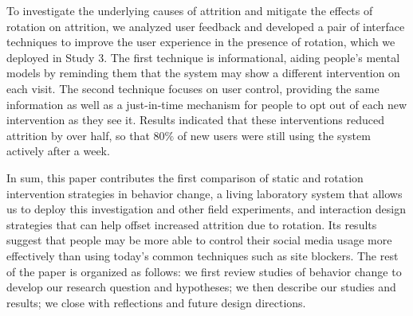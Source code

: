 To investigate the underlying causes of attrition and mitigate the effects of rotation on attrition, we analyzed user feedback and developed a pair of interface techniques to improve the user experience in the presence of rotation, which we deployed in Study 3. The first technique is informational, aiding people's mental models by reminding them that the system may show a different intervention on each visit. The second technique focuses on user control, providing the same information as well as a just-in-time mechanism for people to opt out of each new intervention as they see it. Results indicated that these interventions reduced attrition by over half, so that $80\%$ of new users were still using the system actively after a week.

In sum, this paper contributes the first comparison of static and rotation intervention strategies in behavior change, a living laboratory system that allows us to deploy this investigation and other field experiments, and interaction design strategies that can help offset increased attrition due to rotation. Its results suggest that people may be more able to control their social media usage more effectively than using today's common techniques such as site blockers. The rest of the paper is organized as follows: we first review studies of behavior change to develop our research question and hypotheses; we then describe our studies and results; we close with reflections and future design directions.







